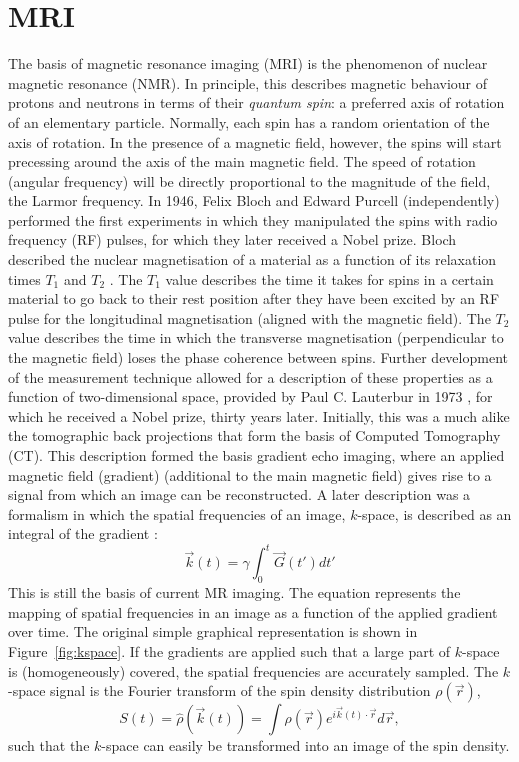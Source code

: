 \section*{MRI}
The basis of magnetic resonance imaging (MRI) is the phenomenon of nuclear magnetic resonance (NMR). In principle, this describes magnetic behaviour of protons and neutrons in terms of their \emph{quantum spin}: a preferred axis of rotation of an elementary particle. Normally, each spin has a random orientation of the axis of rotation. In the presence of a magnetic field, however, the spins will start precessing around the axis of the main magnetic field. The speed of rotation (angular frequency) will be directly proportional to the magnitude of the field, the Larmor frequency. In 1946, Felix Bloch and Edward Purcell (independently) performed the first experiments in which they manipulated the spins with radio frequency (RF) pulses, for which they later received a Nobel prize. Bloch described the nuclear magnetisation of a material as a function of its relaxation times $T_1$ and $T_2$ \cite{Bloch1946}. The $T_1$ value describes the time it takes for spins in a certain material to go back to their rest position after they have been excited by an RF pulse for the longitudinal magnetisation (aligned with the magnetic field). The $T_2$ value describes the time in which the transverse magnetisation (perpendicular to the magnetic field) loses the phase coherence between spins. Further development of the measurement technique allowed for a description of these properties as a function of two-dimensional space, provided by Paul C. Lauterbur in 1973 \cite{Lauterbur1973}, for which he received a Nobel prize, thirty years later. Initially, this was a much alike the tomographic back projections that form the basis of Computed Tomography (CT). This description formed the basis gradient echo imaging, where an applied magnetic field (gradient) (additional to the main magnetic field) gives rise to a signal from which an image can be reconstructed. A later description was a formalism in which the spatial frequencies of an image, $k$-space, is described as an integral of the gradient \cite{Twieg1983,Ljunggren1983}:
\begin{equation}
\vec{k}(t)=\gamma \int_{0}^{t}\vec{G}(t')dt'
\end{equation}
This is still the basis of current MR imaging. The equation represents the mapping of spatial frequencies in an image as a function of the applied gradient over time. The original simple graphical representation is shown in Figure~\ref{fig:kspace}. If the gradients are applied such that a large part of $k$-space is (homogeneously) covered, the spatial frequencies are accurately sampled. The $k$-space signal is the Fourier transform of the spin density distribution $\rho (\vec{r})$,
\begin{equation}
S(t)=\hat{\rho}(\vec{k}(t))=\int\rho(\vec{r})e^{i \vec{k}(t) \cdot \vec{r}}d\vec{r},
\end{equation}
such that the $k$-space can easily be transformed into an image of the spin density.


